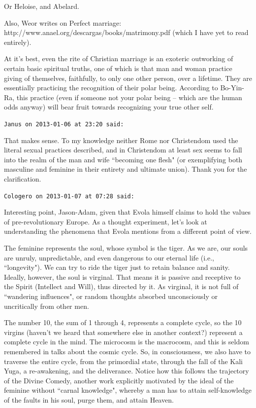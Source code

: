 \begin{footnotesize}
\begin{sffamily}
Or Heloise, and Abelard.

Also, Weor writes on Perfect marriage: http://www.anael.org/descargas/books/matrimony.pdf (which I have yet to read entirely).

At it's best, even the rite of Christian marriage is an exoteric outworking of certain basic spiritual truths, one of which is that man and woman practice giving of themselves, faithfully, to only one other person, over a lifetime. They are essentially practicing the recognition of their polar being. According to Bo-Yin-Ra, this practice (even if someone not your polar being – which are the human odds anyway) will bear fruit towards recognizing your true other self.


\hfill

\texttt{Janus on 2013-01-06 at 23:20 said: }

That makes sense. To my knowledge neither Rome nor Christendom used the literal sexual practices described, and in Christendom at least sex seems to fall into the realm of the man and wife ``becoming one flesh" (or exemplifying both masculine and feminine in their entirety and ultimate union). Thank you for the clarification.


\hfill

\texttt{Cologero on 2013-01-07 at 07:28 said: }

Interesting point, Jason-Adam, given that Evola himself claims to hold the values of pre-revolutionary Europe. As a thought experiment, let's look at understanding the phenomena that Evola mentions from a different point of view.

The feminine represents the soul, whose symbol is the tiger. As we are, our souls are unruly, unpredictable, and even dangerous to our eternal life (i.e., ``longevity"). We can try to ride the tiger just to retain balance and sanity. Ideally, however, the soul is virginal. That means it is passive and receptive to the Spirit (Intellect and Will), thus directed by it. As virginal, it is not full of ``wandering influences", or random thoughts absorbed unconsciously or uncritically from other men.

The number 10, the sum of 1 through 4, represents a complete cycle, so the 10 virgins (haven't we heard that somewhere else in another context?) represent a complete cycle in the mind. The microcosm is the macrocosm, and this is seldom remembered in talks about the cosmic cycle. So, in consciousness, we also have to traverse the entire cycle, from the primordial state, through the fall of the Kali Yuga, a re-awakening, and the deliverance. Notice how this follows the trajectory of the Divine Comedy, another work explicitly motivated by the ideal of the feminine without ``carnal knowledge", whereby a man has to attain self-knowledge of the faults in his soul, purge them, and attain Heaven.


\end{sffamily}
\end{footnotesize}
